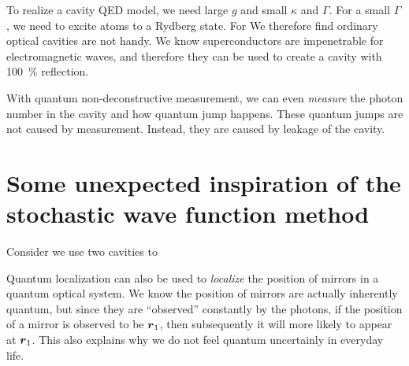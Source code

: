 \documentclass[hyperref, a4paper]{article}
\begin{document}
To realize a cavity QED model, we need large $g$ and small $\kappa$ and $\Gamma$. For a small $\Gamma$, we need 
to excite atoms to a Rydberg state. For %
We therefore find ordinary optical cavities are not handy. We know superconductors are impenetrable for
electromagnetic waves, and therefore they can be used to create a cavity with \SI{100}{\percent} reflection. 

With quantum non-deconstructive measurement, we can even \emph{measure} the photon number in the cavity and 
how quantum jump happens. These quantum jumps are not caused by measurement. Instead, they are caused by 
leakage of the cavity.

\section{Some unexpected inspiration of the stochastic wave function method}

Consider we use two cavities to 

Quantum localization can also be used to \emph{localize} the position of mirrors in a quantum optical system.
We know the position of mirrors are actually inherently quantum, but since they are ``observed'' constantly
by the photons, if the position of a mirror is observed to be $\vb*{r}_1$, then subsequently it will more 
likely to appear at $\vb*{r}_1$. This also explains why we do not feel quantum uncertainly in everyday life.
\end{document}
